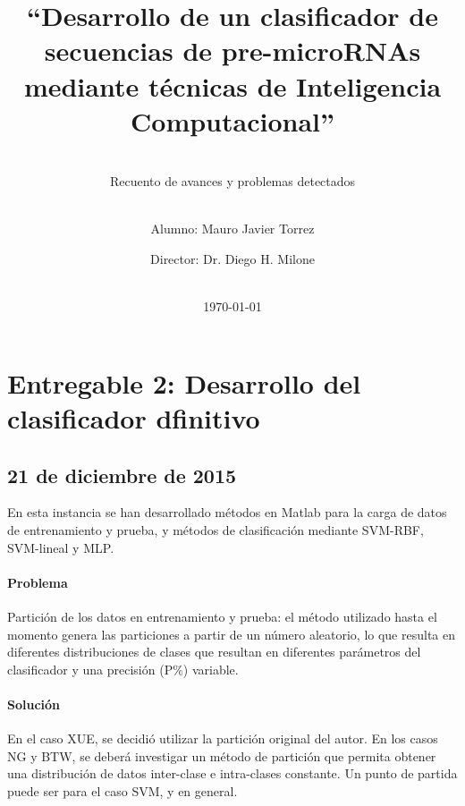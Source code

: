\documentclass[12pt,bibliography=oldstyle,DIV=12,parskip=half-,titlepage]{scrartcl}
\begin{document}
%
%
\titlehead{\center\large
    Universidad Nacional del Litoral\\
    Facultad de Ingeniería y Ciencias Hídricas
}
%
%
\title{\LARGE ``Desarrollo de un clasificador de secuencias de pre-microRNAs
  mediante técnicas de Inteligencia Computacional''}
\subject{Proyecto Final de Carrera\\Ingeniería en
  Informática}
\subtitle{~\\[.2ex]Recuento de avances y problemas detectados\\[.2ex]~}
\author{{Alumno: Mauro Javier Torrez}\and{Director: Dr. Diego H. Milone}}
%
\date{~\\[2em]\today}
%
\renewcommand*{\titlepagestyle}{empty}
\maketitle
\setcounter{page}{1}
%
%
%
%
\section{Entregable 2: Desarrollo del clasificador dfinitivo}
%
\subsection{21 de diciembre de 2015}
%
En esta instancia se han desarrollado métodos en Matlab para la carga
de datos de entrenamiento y prueba, y métodos de clasificación
mediante SVM-RBF, SVM-lineal y MLP.
%
\paragraph{Problema}
Partición de los datos en entrenamiento y prueba: el método utilizado
hasta el momento genera las particiones a partir de un número
aleatorio, lo que resulta en diferentes distribuciones de clases que
resultan en diferentes parámetros del clasificador y una precisión
(P\%) variable.

\paragraph{Solución}
En el caso XUE, se decidió utilizar la partición original del autor.
En los casos NG y BTW, se deberá investigar un método de partición que
permita obtener una distribución de datos inter-clase e intra-clases
constante. Un punto de partida puede ser \cite{yan} para el caso SVM,
y \cite{weiss1} en general.
\end{document}
